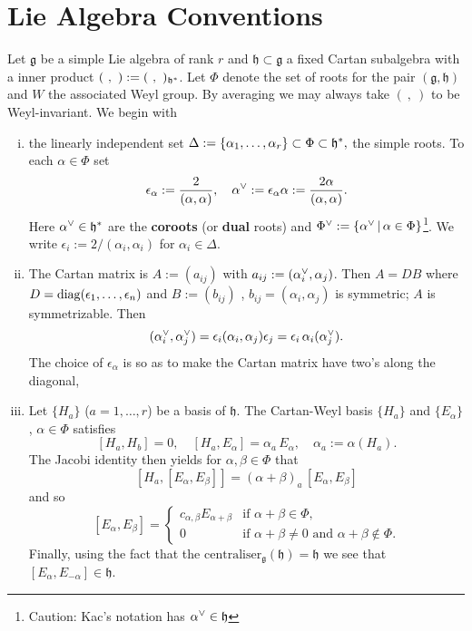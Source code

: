 \documentclass{article}
\begin{document}
  \section{Lie Algebra Conventions}
Let $\mathfrak{g}$ be a simple Lie algebra of rank $r$ and $\mathfrak{h}\subset \mathfrak{g}$ 
a fixed Cartan subalgebra with a  inner product $(\  ,  \ ):=(\  ,  \ )_{\mathfrak{h}\sp\ast}$. 
Let $\Phi$ denote the set of roots for the pair $(\mathfrak{g},\mathfrak{h})$ and $W$ the associated Weyl group. By averaging we may always take  $(\  ,  \ )$ to be Weyl-invariant. We begin with 
\begin{enumerate}[(i)]
	\item the linearly independent set $\Delta:=\{\alpha_1,\ldots,\alpha_r\}\subset\Phi\subset \mathfrak{h}\sp\ast,$ the simple roots. To each $\alpha\in\Phi$ set
	$$\epsilon_\alpha:=\frac2{(\alpha,\alpha)},\quad \alpha\sp\vee :=\epsilon_\alpha \alpha:=\frac{2\alpha}{(\alpha,\alpha)}.
	$$
	Here $\alpha\sp\vee\in \mathfrak{h}\sp\ast$ are the \textbf{coroots} (or \textbf{dual} roots)
	and $\Phi\sp\vee:=\{\alpha\sp\vee \,|\,\alpha\in\Phi\}$\footnote{Caution:
		Kac's notation has $\alpha\sp\vee\in \mathfrak{h} $}. We write $\epsilon_i:={2}/{(\alpha_i ,\alpha_i)}$
	for $\alpha_i\in\Delta$.
	\item The Cartan matrix is $A:=(a_{ij})$ with $ a_{ij}:=(\alpha_i\sp\vee,\alpha_j)$. Then 
	$A=DB$ where $D=\operatorname{diag}(\epsilon_1,\ldots,\epsilon_n)$ and $B:=(b_{ij})$ , $b_{ij}=(\alpha_i ,\alpha_j)$ is symmetric; $A$ is symmetrizable. Then
	$$(\alpha_i\sp\vee,\alpha_j\sp\vee)=\epsilon_i(\alpha_i ,\alpha_j)\epsilon_j=\epsilon_i \,\alpha_i(\alpha_j\sp\vee).
	$$
	The choice of $\epsilon_\alpha$ is so as to make the Cartan matrix have
	two's along the diagonal, 
	
	
	\item Let $\{H_a\}$ ($a=1,\ldots,r$) be a basis of ${\mathfrak{h}}$.
	The Cartan-Weyl basis $\{H_a\}$ and $\{E_\alpha\}$, $\alpha\in\Phi$ satisfies
	$$[H_a,H_b]=0,\quad[H_a,E_\alpha]=\alpha_a\, E_\alpha, \quad \alpha_a:=\alpha(H_a).
	$$
	The Jacobi identity then yields  for $\alpha,\beta\in\Phi$ that
	$$[H_a,[E_\alpha,E_\beta]]=(\alpha+\beta)_a\,[E_\alpha,E_\beta]$$
	and so
	$$[E_\alpha,E_\beta]=
	\begin{cases} c_{\alpha,\beta}E_{\alpha+\beta}&\text{if }\alpha+\beta\in\Phi,\\
	0&\text{if }\alpha+\beta\ne0\text{ and }\alpha+\beta\not\in\Phi.
	\end{cases}
	$$
	Finally, using the fact that the $\text{centraliser}_\mathfrak{g}(\mathfrak{h})=\mathfrak{h}$ we
	see that $[E_\alpha,E_{-\alpha}]\in \mathfrak{h}$.
	

\end{enumerate}
\end{document}
